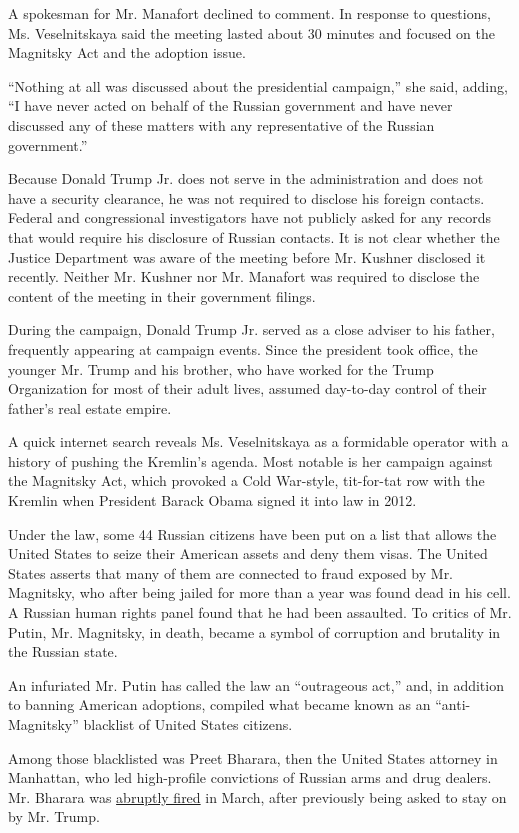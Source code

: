 A spokesman for Mr. Manafort declined to comment. In response to
questions, Ms. Veselnitskaya said the meeting lasted about 30 minutes
and focused on the Magnitsky Act and the adoption issue.

``Nothing at all was discussed about the presidential campaign,'' she
said, adding, ``I have never acted on behalf of the Russian government
and have never discussed any of these matters with any representative of
the Russian government.''

Because Donald Trump Jr. does not serve in the administration and does
not have a security clearance, he was not required to disclose his
foreign contacts. Federal and congressional investigators have not
publicly asked for any records that would require his disclosure of
Russian contacts. It is not clear whether the Justice Department was
aware of the meeting before Mr. Kushner disclosed it recently. Neither
Mr. Kushner nor Mr. Manafort was required to disclose the content of the
meeting in their government filings.

During the campaign, Donald Trump Jr. served as a close adviser to his
father, frequently appearing at campaign events. Since the president
took office, the younger Mr. Trump and his brother, who have worked for
the Trump Organization for most of their adult lives, assumed day-to-day
control of their father's real estate empire.

A quick internet search reveals Ms. Veselnitskaya as a formidable
operator with a history of pushing the Kremlin's agenda. Most notable is
her campaign against the Magnitsky Act, which provoked a Cold War-style,
tit-for-tat row with the Kremlin when President Barack Obama signed it
into law in 2012.

Under the law, some 44 Russian citizens have been put on a list that
allows the United States to seize their American assets and deny them
visas. The United States asserts that many of them are connected to
fraud exposed by Mr. Magnitsky, who after being jailed for more than a
year was found dead in his cell. A Russian human rights panel found that
he had been assaulted. To critics of Mr. Putin, Mr. Magnitsky, in death,
became a symbol of corruption and brutality in the Russian state.

An infuriated Mr. Putin has called the law an ``outrageous act,'' and,
in addition to banning American adoptions, compiled what became known as
an ``anti-Magnitsky'' blacklist of United States citizens.

Among those blacklisted was Preet Bharara, then the United States
attorney in Manhattan, who led high-profile convictions of Russian arms
and drug dealers. Mr. Bharara was
\href{https://www.nytimes3xbfgragh.onion/2017/03/11/us/politics/preet-bharara-us-attorney.html}{abruptly
fired} in March, after previously being asked to stay on by Mr. Trump.

